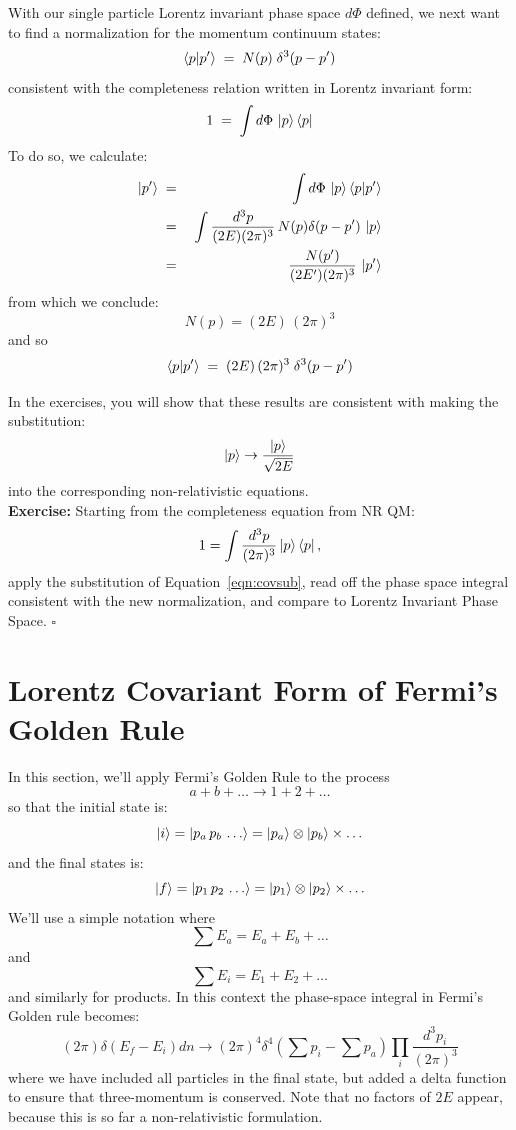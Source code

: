 \documentclass[12pt]{article}
\begin{document}
With our single particle Lorentz invariant phase space $d\Phi$
defined, we next want to find a normalization for the momentum
continuum states:
$$\braket{p|p'} \; = \; N(p) \; \delta^3(p-p')$$
consistent with the completeness relation written in Lorentz invariant
form:
\begin{equation}
1 \; = \; \int d\Phi \, \ket{p}\bra{p}
\end{equation}
To do so, we calculate:
\begin{eqnarray*}
\ket{p'} \; &=& \; \int d\Phi \, \ket{p} \braket{p|p'}\\
 &=& \; \int \frac{d^3p}{(2E) (2\pi)^3} \, N(p) \delta(p-p') \, \ket{p} \\
 &=& \; \frac{N(p')}{(2E') (2\pi)^3} \, \ket{p'} \\
\end{eqnarray*}
from which we conclude:
$$N(p) = (2E) \, (2 \pi)^3$$
and  so
\begin{equation}
\braket{p|p'} \; = \; (2E) \, (2 \pi)^3 \; \delta^3(p-p')
\end{equation}

In the exercises, you will show that these results are consistent with
making the substitution:
\begin{equation}
\label{eqn:covsub}
  \ket{p} \to \frac{\ket{p}}{\sqrt{2E}}
\end{equation}
into the corresponding non-relativistic equations.\\[4pt]

\noindent
{\bf Exercise:} Starting from the completeness equation from NR QM:
$$1 = \int \frac{d^3p}{(2\pi)^3} \ket{p} \bra{p},$$
apply the substitution of Equation~\ref{eqn:covsub},
read off the phase space integral consistent with the new normalization, and compare to Lorentz Invariant Phase Space.  $\square$\\

\section{Lorentz Covariant Form of Fermi's Golden Rule}

In this section, we'll apply Fermi's Golden Rule to the process
$$a + b + \dots \to 1 + 2 + \ldots$$
so that the initial state is:
$$\ket{i} = \ket{p_a \, p_b \, \ldots} = \ket{p_a} \otimes \ket{p_b} \times \ldots$$
and the final states is:
$$\ket{f} = \ket{p_1 \, p_2 \, \ldots} = \ket{p_1} \otimes \ket{p_2} \times \ldots$$
We'll use a simple notation where
$$\sum E_a = E_a + E_b + \ldots$$
and
$$\sum E_i = E_1 + E_2 + \ldots$$
and similarly for products.  In this context the phase-space integral in Fermi's Golden rule becomes:
\begin{equation}
\label{eqn:nrphin}
(2\pi) \delta(E_f - E_i) dn \to (2 \pi)^4 \delta^4(\sum p_i - \sum p_a) \prod_i \frac{d^3 p_i}{(2\pi)^3}
\end{equation}
where we have included all particles in the final state, but added a
delta function to ensure that three-momentum is conserved.  Note that
no factors of $2 E$ appear, because this is so far a non-relativistic
formulation.
\end{document}
